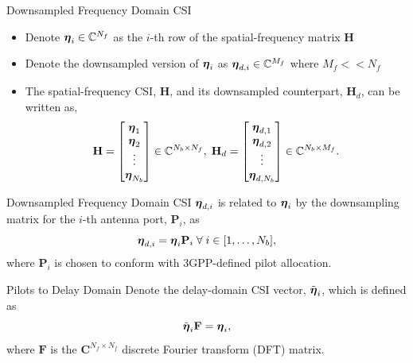 \documentclass{beamer}
\begin{document}
  \begin{frame}{Downsampled Frequency Domain CSI}
    \begin{itemize}
      \item Denote $\boldsymbol{\eta}_i \in \mathbb{C}^{N_f}$ as the $i$-th row of the spatial-frequency matrix $\mathbf{H}$
      \item Denote the downsampled version of $\boldsymbol{\eta}_i$ as $\boldsymbol{\eta}_{d,i} \in \mathbb{C}^{M_f}$ where $M_f << N_f$
      \item The spatial-frequency CSI, $\mathbf{H}$, and its downsampled counterpart, $\mathbf{H}_d$, can be written as,
      \begin{equation}
        \mathbf{H} = \begin{bmatrix} \boldsymbol{\eta}_1 \\ \boldsymbol{\eta}_2 \\ \vdots \\ \boldsymbol{\eta}_{N_b} \\\end{bmatrix}\in\mathbb{C}^{N_b \times N_f}, \; \mathbf{H}_d = \begin{bmatrix} \boldsymbol{\eta}_{d,1} \\ \boldsymbol{\eta}_{d,2} \\ \vdots \\ \boldsymbol{\eta}_{d,N_b} \\\end{bmatrix}\in\mathbb{C}^{N_b \times M_f}.
      \end{equation}
    \end{itemize}
  \end{frame}

  \begin{frame}{Downsampled Frequency Domain CSI}
    $\boldsymbol{\eta}_{d,i}$ is related to $\boldsymbol{\eta}_i$ by the downsampling matrix for the $i$-th antenna port, $\mathbf{P}_i$, as
    \begin{equation}
      \boldsymbol{\eta}_{d,i} = \boldsymbol{\eta}_i \mathbf{P}_i \; \forall \; i \in [1, \dots, N_b],
    \end{equation}
    where $\mathbf{P}_i$ is chosen to conform with 3GPP-defined pilot allocation.
  \end{frame}

  \begin{frame}{Pilots to Delay Domain}
    Denote the delay-domain CSI vector, $\tilde{\boldsymbol{\eta}}_i$, which is defined as
    \begin{equation}
      \tilde{\boldsymbol{\eta}}_{i}\mathbf{F} = \boldsymbol{\eta}_i, \label{eq:dft}
    \end{equation}
    where $\mathbf{F}$ is the $\mathbf{C}^{N_f \times N_f}$ discrete Fourier transform (DFT) matrix.
  \end{frame}
\end{document}
